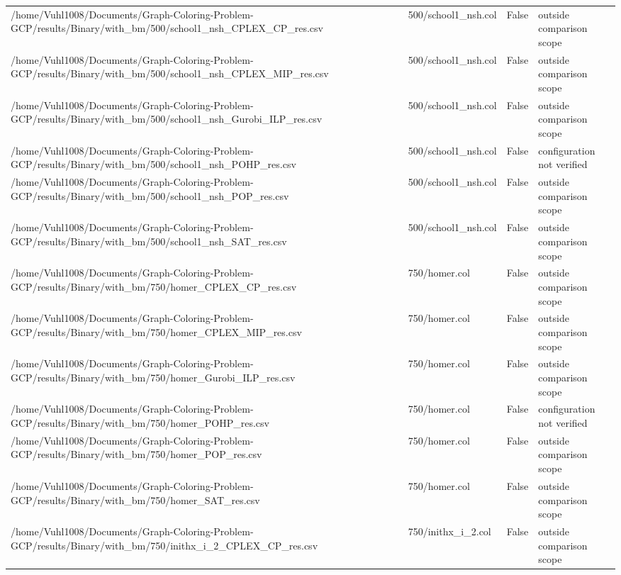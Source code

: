 \begin{table}[htbp]
\begin{tabular}{llll}
/home/Vuhl1008/Documents/Graph-Coloring-Problem-GCP/results/Binary/with\_bm/500/school1\_nsh\_CPLEX\_CP\_res.csv & 500/school1\_nsh.col & False & outside comparison scope \\
/home/Vuhl1008/Documents/Graph-Coloring-Problem-GCP/results/Binary/with\_bm/500/school1\_nsh\_CPLEX\_MIP\_res.csv & 500/school1\_nsh.col & False & outside comparison scope \\
/home/Vuhl1008/Documents/Graph-Coloring-Problem-GCP/results/Binary/with\_bm/500/school1\_nsh\_Gurobi\_ILP\_res.csv & 500/school1\_nsh.col & False & outside comparison scope \\
/home/Vuhl1008/Documents/Graph-Coloring-Problem-GCP/results/Binary/with\_bm/500/school1\_nsh\_POHP\_res.csv & 500/school1\_nsh.col & False & configuration not verified \\
/home/Vuhl1008/Documents/Graph-Coloring-Problem-GCP/results/Binary/with\_bm/500/school1\_nsh\_POP\_res.csv & 500/school1\_nsh.col & False & outside comparison scope \\
/home/Vuhl1008/Documents/Graph-Coloring-Problem-GCP/results/Binary/with\_bm/500/school1\_nsh\_SAT\_res.csv & 500/school1\_nsh.col & False & outside comparison scope \\
/home/Vuhl1008/Documents/Graph-Coloring-Problem-GCP/results/Binary/with\_bm/750/homer\_CPLEX\_CP\_res.csv & 750/homer.col & False & outside comparison scope \\
/home/Vuhl1008/Documents/Graph-Coloring-Problem-GCP/results/Binary/with\_bm/750/homer\_CPLEX\_MIP\_res.csv & 750/homer.col & False & outside comparison scope \\
/home/Vuhl1008/Documents/Graph-Coloring-Problem-GCP/results/Binary/with\_bm/750/homer\_Gurobi\_ILP\_res.csv & 750/homer.col & False & outside comparison scope \\
/home/Vuhl1008/Documents/Graph-Coloring-Problem-GCP/results/Binary/with\_bm/750/homer\_POHP\_res.csv & 750/homer.col & False & configuration not verified \\
/home/Vuhl1008/Documents/Graph-Coloring-Problem-GCP/results/Binary/with\_bm/750/homer\_POP\_res.csv & 750/homer.col & False & outside comparison scope \\
/home/Vuhl1008/Documents/Graph-Coloring-Problem-GCP/results/Binary/with\_bm/750/homer\_SAT\_res.csv & 750/homer.col & False & outside comparison scope \\
/home/Vuhl1008/Documents/Graph-Coloring-Problem-GCP/results/Binary/with\_bm/750/inithx\_i\_2\_CPLEX\_CP\_res.csv & 750/inithx\_i\_2.col & False & outside comparison scope \\

\end{tabular}
\end{table}
